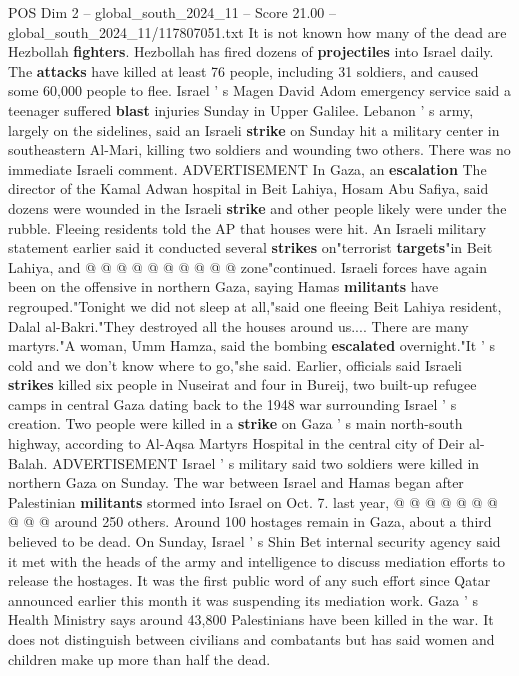 \begin{textsample}{POS Dim 2 – global\_south\_2024\_11 – Score 21.00 – global\_south\_2024\_11/117807051.txt}
It is not known how many of the dead are Hezbollah \textbf{fighters}.
Hezbollah has fired dozens of \textbf{projectiles} into Israel daily.
The \textbf{attacks} have killed at least 76 people, including 31 soldiers, and caused some 60,000 people to flee.
Israel ' s Magen David Adom emergency service said a teenager suffered \textbf{blast} injuries Sunday in Upper Galilee.
Lebanon ' s army, largely on the sidelines, said an Israeli \textbf{strike} on Sunday hit a military center in southeastern Al-Mari, killing two soldiers and wounding two others.
There was no immediate Israeli comment.
ADVERTISEMENT In Gaza, an \textbf{escalation} The director of the Kamal Adwan hospital in Beit Lahiya, Hosam Abu Safiya, said dozens were wounded in the Israeli \textbf{strike} and other people likely were under the rubble.
Fleeing residents told the AP that houses were hit.
An Israeli military statement earlier said it conducted several \textbf{strikes} on"terrorist \textbf{targets}"in Beit Lahiya, and @ @ @ @ @ @ @ @ @ @ zone"continued.
Israeli forces have again been on the offensive in northern Gaza, saying Hamas \textbf{militants} have regrouped."Tonight we did not sleep at all,"said one fleeing Beit Lahiya resident, Dalal al-Bakri."They destroyed all the houses around us....
There are many martyrs."A woman, Umm Hamza, said the bombing \textbf{escalated} overnight."It ' s cold and we don't know where to go,"she said.
Earlier, officials said Israeli \textbf{strikes} killed six people in Nuseirat and four in Bureij, two built-up refugee camps in central Gaza dating back to the 1948 war surrounding Israel ' s creation.
Two people were killed in a \textbf{strike} on Gaza ' s main north-south highway, according to Al-Aqsa Martyrs Hospital in the central city of Deir al-Balah.
ADVERTISEMENT Israel ' s military said two soldiers were killed in northern Gaza on Sunday.
The war between Israel and Hamas began after Palestinian \textbf{militants} stormed into Israel on Oct. 7. last year, @ @ @ @ @ @ @ @ @ @ around 250 others.
Around 100 hostages remain in Gaza, about a third believed to be dead.
On Sunday, Israel ' s Shin Bet internal security agency said it met with the heads of the army and intelligence to discuss mediation efforts to release the hostages.
It was the first public word of any such effort since Qatar announced earlier this month it was suspending its mediation work.
Gaza ' s Health Ministry says around 43,800 Palestinians have been killed in the war.
It does not distinguish between civilians and combatants but has said women and children make up more than half the dead.

\end{textsample}
